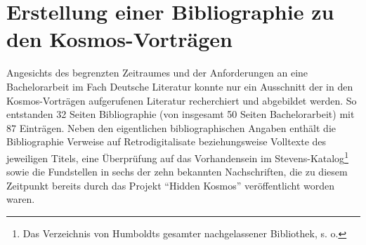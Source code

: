 \documentclass[a4paper,
fontsize=11pt,
oneside,
numbers=noperiodatend,
parskip=half-,
bibliography=totoc,
final
]{scrartcl}
\begin{document}
\section*{Erstellung einer Bibliographie zu den
Kosmos-Vorträgen}\label{erstellung-einer-bibliographie-zu-den-kosmos-vortruxe4gen}

Angesichts des begrenzten Zeitraumes und der Anforderungen an eine
Bachelorarbeit im Fach Deutsche Literatur konnte nur ein Ausschnitt der
in den Kosmos-Vorträgen aufgerufenen Literatur recherchiert und
abgebildet werden. So entstanden 32 Seiten Bibliographie (von insgesamt
50 Seiten Bachelorarbeit) mit 87 Einträgen. Neben den eigentlichen
bibliographischen Angaben enthält die Bibliographie Verweise auf
Retrodigitalisate beziehungsweise Volltexte des jeweiligen Titels, eine
Überprüfung auf das Vorhandensein im Stevens-Katalog\footnote{Das
  Verzeichnis von Humboldts gesamter nachgelassener Bibliothek, s. o.}
sowie die Fundstellen in sechs der zehn bekannten Nachschriften, die zu
diesem Zeitpunkt bereits durch das Projekt \enquote{Hidden Kosmos}
veröffentlicht worden waren.
\end{document}
